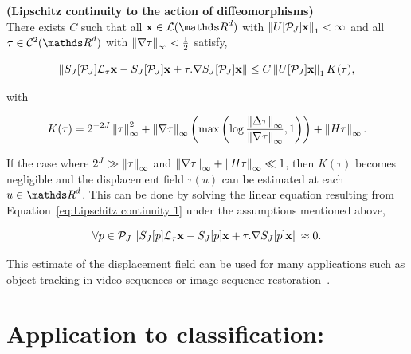 \documentclass[a4paper,11pt]{report}
\begin{document}
			\begin{thm} \textbf{(Lipschitz continuity to the action of diffeomorphisms)} \\
			  There exists $C$ such that all $\bfx \in \mcalL(\dsR^{d})$ with $\left\lVert U[\mathcal{P}_{J}]{\bf x} \right\rVert_{1} < \infty$ and all $\tau \in \mcalC^{2}(\dsR^{d})$ with $\left\lVert \nabla \tau \right\rVert_{\infty} < \frac{1}{2}$ satisfy,
			  
			  \begin{equation}
					\left\lVert S_{J}[\mathcal{P}_{J}]\mathcal{L}_{\tau}{\bf x} - S_{J}[\mathcal{P}_{J}]{\bf x} + \tau . \nabla S_{J}[\mathcal{P}_{J}]{\bf x} \right\rVert \leq C \left\lVert U[\mathcal{P}_{J}]{\bf x} \right\rVert_{1} K(\tau),
					\label{eq:Lipschitz continuity 1}
			  \end{equation}

			  with
			  
			  \begin{equation}
					K(\tau) = 2^{-2J} \left\lVert \tau \right\rVert_{\infty}^{2} + \left\lVert \nabla \tau \right\rVert_{\infty} \left(\max \left( \log \frac{\left\lVert \Delta \tau \right\rVert_{\infty}}{\left\lVert \nabla \tau \right\rVert_{\infty}},1 \right) \right) + \left\lVert H\tau \right\rVert_{\infty}.
					\label{eq:Lipschitz continuity K(tau)}
			  \end{equation}
			  \label{thm:Lipschitz continuity}
			\end{thm}
			
			\begin{rem}
				If the case where $2^{J} \gg \left\lVert \tau \right\rVert_{\infty}$ and $\left\lVert \nabla \tau \right\rVert_{\infty} + \left\lVert H \tau \right\rVert_{\infty} \ll 1$, then $K(\tau)$ becomes negligible and the displacement field $\tau(u)$ can be estimated at each $u \in \dsR^{d}$. This can be done by solving the linear equation resulting from Equation~\ref{eq:Lipschitz continuity 1} under the assumptions mentioned above,
				
				\begin{equation}
					\forall p \in \mathcal{P}_{J} \left\lVert S_{J}[p]\mathcal{L}_{\tau}{\bf x} - S_{J}[p]{\bf x} + \tau . \nabla S_{J}[p]{\bf x} \right\rVert \approx 0.
					\label{eq:Lipschitz continuity 2}  
				\end{equation}
				
				This estimate of the displacement field can be used for many applications such as object tracking in video sequences or image sequence restoration~\citep{brailean1996recursive}.
			\end{rem}
			
		
  \section{Application to classification:}
    \label{sec:ST/Applications to clf}
   
\end{document}
